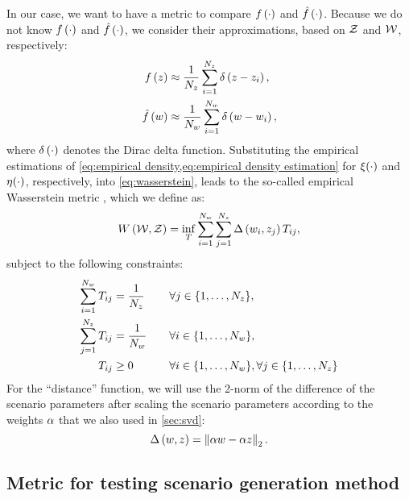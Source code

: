 In our case, we want to have a metric to compare $f\left( \cdot \right)$ and $\hat{f}\left( \cdot \right)$.
Because we do not know $f\left( \cdot \right)$ and $\hat{f}\left( \cdot \right)$, we consider their approximations, based on $\mathcal{Z}$ and $\mathcal{W}$, respectively:
\begin{align}
	f\left( z \right) &\approx
	\frac{1}{N_z} \sum_{i=1}^{N_z}
	\delta\left(z - z_{i}\right), \label{eq:empirical density}\\
	\hat{f}\left( w \right) &\approx
	\frac{1}{N_w} \sum_{i=1}^{N_w}
	\delta\left(w - w_{i}\right), \label{eq:empirical density estimation}
\end{align}
where $\delta\left(\cdot\right)$ denotes the Dirac delta function.
Substituting the empirical estimations of \cref{eq:empirical density,eq:empirical density estimation} for $\xi(\cdot)$ and $\eta(\cdot)$, respectively, into \cref{eq:wasserstein}, leads to the so-called empirical Wasserstein metric \autocite{sommerfeld2018inference}, which we define as:
\begin{equation}
	W\left(\mathcal{W},\mathcal{Z}\right)
	= \inf_{T} 
	\sum_{i=1}^{N_w} \sum_{j=1}^{N_z} 
	\Delta\left(w_{i},z_{j}\right)
	T_{i j},
\end{equation}
subject to the following constraints:
\begin{alignat}{2}
	\sum_{i=1}^{N_w} T_{i j} &= \frac{1}{N_z} \quad && \forall j \in \{1,\ldots,N_z\}, \\
	\sum_{j=1}^{N_z} T_{i j} &= \frac{1}{N_w} \quad && \forall i \in \{1,\ldots,N_w\}, \\
	T_{i j} &\geq 0 \quad && \forall i \in \{1,\ldots,N_w\}, \forall j \in \{1,\ldots,N_z\}
\end{alignat}
For the ``distance'' function, we will use the 2-norm of the difference of the scenario parameters after scaling the scenario parameters according to the weights $\alpha$ that we also used in \cref{sec:svd}:
\begin{equation}
	\Delta\left(w,z\right) = \left\Vert \alpha w - \alpha z \right\Vert_2.
\end{equation}



\subsection{Metric for testing scenario generation method}
\label{sec:metric scenario generation method}

